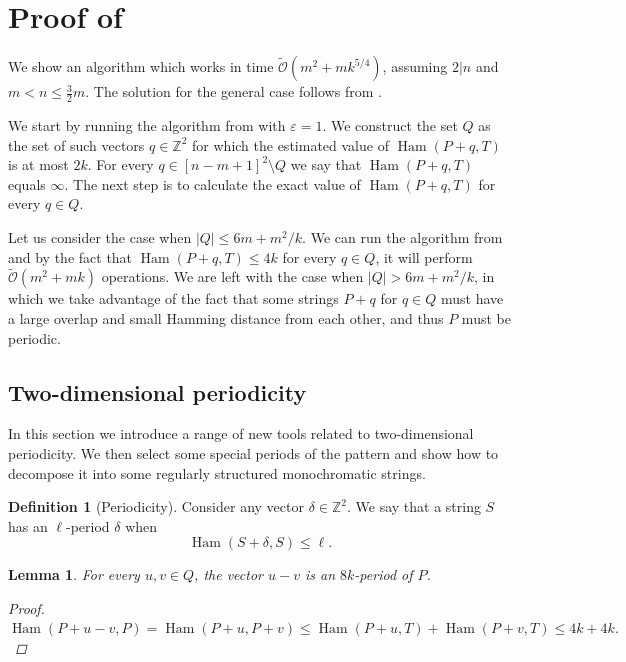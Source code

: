 \documentclass[11pt]{article}
\newcommand{\Z}{\mathbb{Z}}
\newcommand{\tO}{\tilde{\mathcal{O}}}
\theoremstyle{plain}
\newtheorem{lemma}{Lemma}
\theoremstyle{definition}
\newtheorem{definition}{Definition}
\theoremstyle{remark}
\DeclareMathOperator*{\Ham}{Ham}
\begin{document}
\section{Proof of }

\MainResult

We show an algorithm which works in time $\tO(m^2 + mk^{5/4})$, assuming $2|n$ and $m < n \le \frac{3}{2}m$.
The solution for the general case follows from . 

We start by running the algorithm from  with $\varepsilon = 1$.
We construct the set $Q$ as the set of such vectors $q \in \Z^2$ for which the estimated value of $\Ham(P + q, T)$ is at most $2k$.
For every $q \in [n - m + 1]^2 \setminus Q$ we say that $\Ham(P + q, T)$ equals $\infty$.
The next step is to calculate the exact value of $\Ham(P + q, T)$ for every $q \in Q$.

Let us consider the case when $|Q| \le 6m + m^2/k$.
We can run the algorithm from  and by the fact that $\Ham(P + q, T) \le 4k$ for every $q \in Q$, it will perform $\tO(m^2 + mk)$ operations.
We are left with the case when $|Q| > 6m + m^2/k$, in which we take advantage of the fact that some strings $P + q$ for $q \in Q$ must have a large overlap and small Hamming distance from each other, and thus $P$ must be periodic.


\newcommand{\T}{\mathcal{T}}
\renewcommand{\S}{\mathcal{S}}
\renewcommand{\P}{\mathcal{P}}
\newcommand{\U}{\mathcal{U}}
\newcommand{\V}{\mathcal{V}}
\newcommand{\F}{\mathcal{F}}
\renewcommand{\L}{\mathcal{L}}


\subsection{Two-dimensional periodicity} \label{periodicity_section}
In this section we introduce a range of new tools related to two-dimensional periodicity.
We then select some special periods of the pattern and show how to decompose it into some regularly structured monochromatic strings.


\begin{definition}[Periodicity]
	Consider any vector $\delta \in \Z^2$.
	We say that a string $S$ has an $\ell$-period $\delta$ when
	\[ \Ham(S + \delta, S) \le \ell. \]
\end{definition}


\begin{lemma} \label{periodicity_lemma}
	For every $u, v \in Q$, the vector $u - v$ is an $8k$-period of $P$.
	\begin{proof}
		$\Ham(P + u - v, P) = \Ham(P + u, P + v) \le \Ham(P + u, T) + \Ham(P + v, T) \le 4k + 4k. $
	\end{proof}
\end{lemma}
\end{document}
